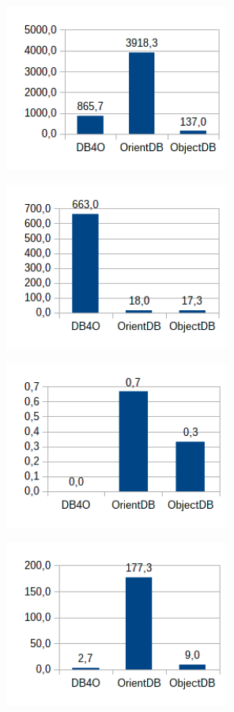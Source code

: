 \begin{figure}[!h]
\begin{subfigure}[b]{0.5\textwidth}
\includegraphics[width=20em]{obr/bench/oodbms9}
\end{subfigure}
\begin{subfigure}[b]{0.5\textwidth}
\includegraphics[width=20em]{obr/bench/oodbms10}
\end{subfigure}
\begin{subfigure}[b]{0.5\textwidth}
\includegraphics[width=20em]{obr/bench/oodbms11}
\end{subfigure}
\begin{subfigure}[b]{0.5\textwidth}
\includegraphics[width=20em]{obr/bench/oodbms12}

\end{subfigure}
\end{figure}
